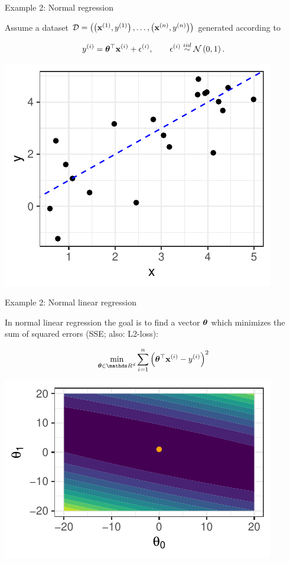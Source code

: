 \begin{vbframe}{Example 2: Normal regression}

Assume a dataset $\mathcal{D} = \left( \left(\mathbf{x}^{(1)}, y^{(1)}\right), \ldots, \left(\mathbf{x}^{(n)}, y^{(n)}\right)\right)$ generated according to

$$
y^{(i)} = \bm{\theta}^\top \mathbf{x}^{(i)} + \epsilon^{(i)}, \qquad \epsilon^{(i)} \overset{iid}{\sim} \mathcal{N}\left(0, 1\right).
$$

\begin{center}
	\includegraphics[height=0.4\textwidth, keepaspectratio]{figure_man/ml_linreg_example_1.pdf} 
\end{center}



\end{vbframe}

\begin{vbframe}{Example 2: Normal linear regression} 


In normal linear regression the goal is to find a vector $\bm{\theta}$ which minimizes the sum of squared errors (SSE; also: L2-loss): 

$$
\min_{\thetab \in \R^d} \sum_{i = 1}^n \left(\thetab^\top \xi - \yi\right)^2
$$

\begin{center}
	\includegraphics[height=0.30\textwidth, keepaspectratio]{figure_man/ml_linreg_example_2.pdf}
\end{center}

\end{vbframe}

